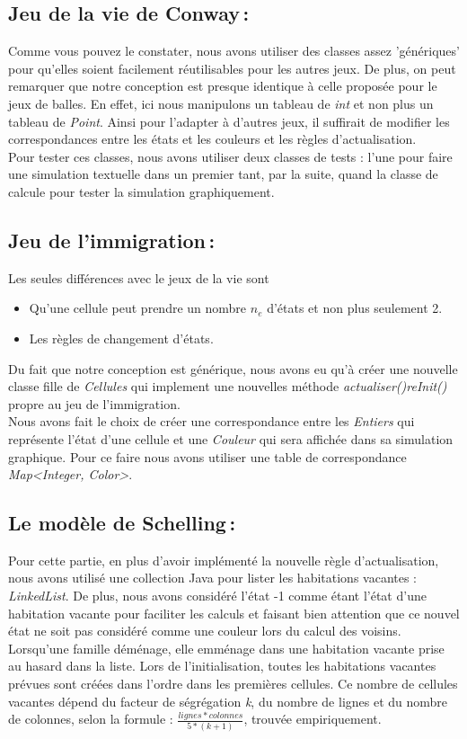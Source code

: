 \documentclass[a4paper, 10pt, french]{article}
\begin{document}
	\subsection{Jeu de la vie de Conway\,: }
		{Comme vous pouvez le constater, nous avons utiliser des classes assez 'génériques' pour qu'elles soient facilement réutilisables pour les autres jeux. De plus, on peut remarquer que notre conception est presque identique à celle proposée pour le jeux de balles. En effet, ici nous manipulons un tableau de {\em int} et non plus un tableau de {\em Point}. Ainsi pour l'adapter à d'autres jeux, il suffirait de modifier les correspondances entre les états et les couleurs et les règles d'actualisation.
\\ \indent Pour tester ces classes, nous avons utiliser deux classes de tests : l'une pour faire une simulation textuelle dans un premier tant, par la suite, quand la classe de calcule pour tester la simulation graphiquement.
		} 
\subsection{Jeu de l'immigration\,:}
	{
Les seules différences avec le jeux de la vie sont 
	\begin{itemize}
		\item Qu'une cellule peut prendre un nombre {\em $n_e$} d'états et non plus seulement 2.
		\item Les règles de changement d'états.
	\end{itemize}
\indent Du fait que notre conception est générique, nous avons eu qu'à créer une nouvelle classe fille de {\em Cellules} qui implement une nouvelles méthode {\em actualiser()}{\em reInit()} propre au jeu de l'immigration. 
\\ \indent Nous avons fait le choix de créer une correspondance entre les {\em Entiers} qui représente l'état d'une cellule et une {\em Couleur} qui sera affichée dans sa simulation graphique. Pour ce faire nous avons utiliser une table de correspondance {\em Map<Integer, Color>}.
	}
\subsection{Le modèle de Schelling\,:}
 	{ 
        \indent Pour cette partie, en plus d'avoir implémenté la nouvelle règle d'actualisation, nous avons utilisé une collection Java pour lister les habitations vacantes : {\em LinkedList}.
        De plus, nous avons considéré l'état -1 comme étant l'état d'une habitation vacante pour faciliter les calculs et faisant bien attention que ce nouvel état ne soit pas considéré comme une couleur lors du calcul des voisins.
        Lorsqu'une famille déménage, elle emménage dans une habitation vacante prise au hasard dans la liste.
        Lors de l'initialisation, toutes les habitations vacantes prévues sont créées dans l'ordre dans les premières cellules. Ce nombre de cellules vacantes dépend du facteur de ségrégation {\em k}, du nombre de lignes et du nombre de colonnes, selon la formule : $ \frac{lignes*colonnes}{5*(k+1)} $, trouvée empiriquement.
	} 
\end{document}
